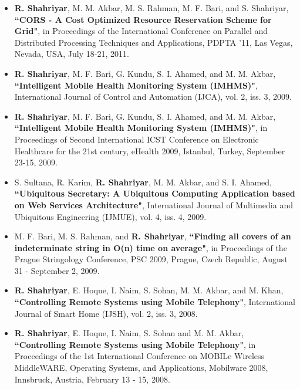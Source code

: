 \documentclass[letterpaper,11pt]{article}
\begin{document}
\begin{itemize}
\item {\bf R. Shahriyar}, M. M. Akbar, M. S. Rahman, M. F. Bari, and S. Shahriyar, {\color{black} \bf
    ``CORS - A Cost Optimized Resource Reservation Scheme for Grid"}, in Proceedings of the International Conference on Parallel and Distributed Processing Techniques and Applications, PDPTA '11, Las Vegas, Nevada, USA, July 18-21, 2011. 

\item {\bf R. Shahriyar}, M. F. Bari, G. Kundu, S. I. Ahamed, and M. M. Akbar,  {\color{black} \bf
    ``Intelligent Mobile Health Monitoring System (IMHMS)"}, International Journal of Control and Automation (IJCA), vol. 2, iss. 3, 2009. 
    
\item {\bf R. Shahriyar}, M. F. Bari, G. Kundu, S. I. Ahamed, and M. M. Akbar,  {\color{black} \bf
    ``Intelligent Mobile Health Monitoring System (IMHMS)"}, in Proceedings of Second International ICST Conference on Electronic Healthcare for the 21st century, eHealth 2009, Istanbul, Turkey, September 23-15, 2009.


\item S. Sultana, R. Karim, {\bf R. Shahriyar}, M. M. Akbar, and S. I. Ahamed,  {\color{black} \bf
    ``Ubiquitous Secretary: A Ubiquitous Computing Application based on Web Services Architecture"}, International Journal of Multimedia and Ubiquitous Engineering (IJMUE), vol. 4, iss. 4, 2009. 
    
\item M. F. Bari, M. S. Rahman, and {\bf R. Shahriyar},  {\color{black} \bf
    ``Finding all covers of an indeterminate string in O(n) time on average"}, in Proceedings of the Prague Stringology Conference, PSC 2009, Prague, Czech Republic, August 31 - September 2, 2009. 

\item {\bf R. Shahriyar}, E. Hoque, I. Naim, S. Sohan, M. M. Akbar, and M. Khan,  {\color{black} \bf
    ``Controlling Remote Systems using Mobile Telephony"}, International Journal of Smart Home (IJSH), vol. 2, iss. 3, 2008. 
    
\item {\bf R. Shahriyar}, E. Hoque, I. Naim, S. Sohan and M. M. Akbar, {\color{black} \bf
    ``Controlling Remote Systems using Mobile Telephony"}, in Proceedings of the 1st International Conference on MOBILe Wireless MiddleWARE, Operating Systems, and Applications, Mobilware 2008, Innsbruck, Austria, February 13 - 15, 2008. 


\end{itemize}
\end{document}
